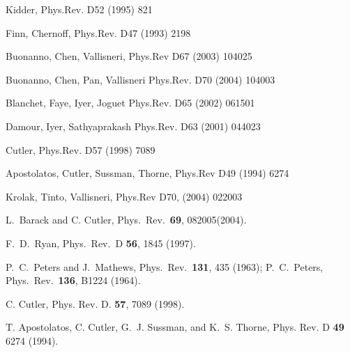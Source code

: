  Kidder, Phys.Rev. D52 (1995) 821

 Finn, Chernoff, Phys.Rev. D47 (1993) 2198

 Buonanno, Chen, Vallisneri, Phys.Rev D67 (2003) 104025

 Buonanno, Chen, Pan, Vallisneri Phys.Rev. D70 (2004)
104003 

 Blanchet, Faye, Iyer, Joguet Phys.Rev. D65 (2002) 061501

 Damour, Iyer, Sathyaprakash Phys.Rev. D63 (2001) 044023

 Cutler, Phys.Rev. D57 (1998) 7089

 Apostolatos, Cutler, Sussman, Thorne, Phys.Rev D49 (1994) 6274

 Krolak,  Tinto, Vallisneri, Phys.Rev D70, (2004) 022003



 L.\ Barack and C. Cutler, Phys.\ Rev.\ {\bf 69}, 082005(2004).

    F.\ D.\ Ryan, Phys.\ Rev.\ D {\bf 56}, 1845 (1997).


P.\ C.\ Peters and J.\ Mathews, Phys.\ Rev.\ {\bf 131}, 435 (1963);
P.\ C.\ Peters, Phys.\ Rev.\ {\bf 136}, B1224 (1964).




    C. Cutler, Phys. Rev. D. {\bf 57}, 7089 (1998).


    T. Apostolatos, C. Cutler, G.~J. Sussman, and  K.~S. Thorne,
    Phys. Rev. D {\bf 49} 6274 (1994).

